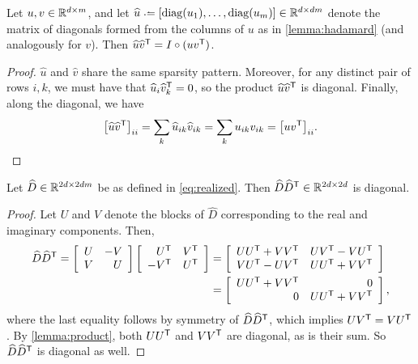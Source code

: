 \documentclass{article} %
\begin{document}
\begin{lemma}
Let ${u, v \in \mathbb{R}^{d\times m}}$, and let ${\widehat{u} \defeq
[\diag(u_1),\dots,\diag(u_m)] \in \R^{d\times dm}}$ denote the 
matrix of diagonals formed from the columns of $u$ as in \cref{lemma:hadamard} 
(and analogously for $v$).  Then ${\widehat{u}\widehat{v}^\mathsf{T} = I \circ (uv^\mathsf{T})}$.
\label{lemma:product}
\end{lemma}
\begin{proof}
$\widehat{u}$ and $\widehat{v}$ share the same sparsity pattern.  Moreover, for any
distinct pair of rows $i, k$, we must have that $\widehat{u}_i \widehat{v}_k^\mathsf{T} = 0$, 
so the product $\widehat{u}\widehat{v}^\mathsf{T}$ is diagonal.  Finally, along the diagonal, 
we have
\[
{\left[\widehat{u}\widehat{v}^\mathsf{T}\right]}_{ii} = \sum_k \widehat{u}_{ik}
\widehat{v}_{ik} = \sum_{k} u_{ik} v_{ik} = {\left[uv^\mathsf{T}\right]}_{ii}.
\]
\end{proof}

\begin{theorem}
Let $\widehat{D} \in \mathbb{R}^{2d\times 2dm}$ be as defined in \eqref{eq:realized}.  Then
$\widehat{D}\widehat{D}^\mathsf{T} \in \mathbb{R}^{2d\times 2d}$ is diagonal.\label{thm:diagonal}
\end{theorem}
\begin{proof}
Let $U$ and $V$ denote the blocks of $\widehat{D}$ corresponding to the
real and imaginary components.  Then,
\begin{align}
\widehat{D}\widehat{D}^\mathsf{T} = \left[\begin{array}{rr}U & -V\\ V & U\end{array}\right]
\left[\begin{array}{rr} U^\mathsf{T} & V^\mathsf{T}\\ -V^\mathsf{T} & U^\mathsf{T}\end{array}\right]
&= \left[\begin{array}{rr} UU^\mathsf{T} + VV^\mathsf{T} & UV^\mathsf{T} - VU^\mathsf{T} \\ VU^\mathsf{T} -
UV^\mathsf{T} & UU^\mathsf{T} + VV^\mathsf{T}\end{array} \right]\notag\\
&= \left[\begin{array}{rr}UU^\mathsf{T} + VV^\mathsf{T} & 0 \\ 0 & UU^\mathsf{T} + VV^\mathsf{T}\end{array}
\right],\label{eq:dictpower}
\end{align}
where the last equality follows by symmetry of $\widehat{D}\widehat{D}^\mathsf{T}$, which
implies $UV^\mathsf{T} = VU^\mathsf{T}$.  By \cref{lemma:product}, both $UU^\mathsf{T}$ and $VV^\mathsf{T}$ are 
diagonal, as is their sum.  So $\widehat{D}\widehat{D}^\mathsf{T}$ is diagonal as well.
\end{proof}
\end{document}
